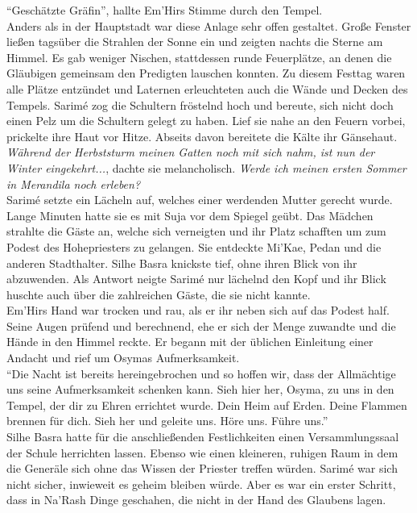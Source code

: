 ``Geschätzte Gräfin'', hallte Em'Hirs Stimme durch den Tempel.\\
Anders als in der Hauptstadt war diese Anlage sehr offen gestaltet. Große Fenster ließen tagsüber 
die Strahlen der Sonne ein und zeigten nachts die Sterne am Himmel. Es gab weniger Nischen, 
stattdessen runde Feuerplätze, an denen die Gläubigen gemeinsam den Predigten lauschen konnten. Zu 
diesem Festtag waren alle Plätze entzündet und Laternen erleuchteten auch die Wände und Decken des 
Tempels. Sarimé zog die Schultern fröstelnd hoch und bereute, sich nicht doch einen Pelz um die 
Schultern gelegt zu haben. Lief sie nahe an den Feuern vorbei, prickelte ihre Haut vor Hitze. 
Abseits davon bereitete die Kälte ihr Gänsehaut.\\
\textit{Während der Herbststurm meinen Gatten noch mit sich nahm, ist nun der Winter 
eingekehrt...}, dachte sie melancholisch. \textit{Werde ich meinen ersten Sommer in Merandila noch 
erleben?}\\
Sarimé setzte ein Lächeln auf, welches einer werdenden Mutter gerecht wurde. Lange Minuten hatte 
sie es mit Suja vor dem Spiegel geübt. Das Mädchen strahlte die Gäste an, welche sich verneigten 
und ihr Platz schafften um zum Podest des Hohepriesters zu gelangen. Sie entdeckte Mi'Kae, Pedan 
und die anderen Stadthalter. Silhe Basra knickste tief, ohne ihren Blick von ihr abzuwenden. Als 
Antwort neigte Sarimé nur lächelnd den Kopf und ihr Blick huschte auch über die zahlreichen Gäste, 
die sie nicht kannte.\\
Em'Hirs Hand war trocken und rau, als er ihr neben sich auf das Podest half. Seine Augen prüfend und 
berechnend, ehe er sich der Menge zuwandte und die Hände in den Himmel reckte. Er begann mit der 
üblichen Einleitung einer Andacht und rief um Osymas Aufmerksamkeit.\\
``Die Nacht ist bereits hereingebrochen und so hoffen wir, dass der Allmächtige uns seine 
Aufmerksamkeit schenken kann. Sieh hier her, Osyma, zu uns in den Tempel, der dir zu Ehren 
errichtet wurde. Dein Heim auf Erden. Deine Flammen brennen für dich. Sieh her und geleite uns. 
Höre uns. Führe uns.''\\
Silhe Basra hatte für die anschließenden Festlichkeiten einen Versammlungssaal der Schule 
herrichten lassen. Ebenso wie einen kleineren, ruhigen Raum in dem die Generäle sich ohne das Wissen der Priester treffen 
würden. Sarimé war sich nicht sicher, inwieweit es geheim bleiben würde. Aber es war ein erster Schritt, dass in Na'Rash Dinge geschahen, die nicht in der Hand des Glaubens lagen.\\
